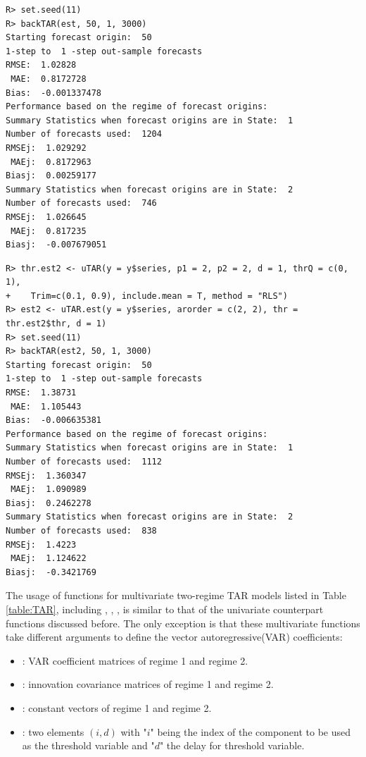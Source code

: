 \begin{verbatim}
R> set.seed(11)
R> backTAR(est, 50, 1, 3000)
Starting forecast origin:  50 
1-step to  1 -step out-sample forecasts 
RMSE:  1.02828 
 MAE:  0.8172728 
Bias:  -0.001337478 
Performance based on the regime of forecast origins:  
Summary Statistics when forecast origins are in State:  1 
Number of forecasts used:  1204 
RMSEj:  1.029292 
 MAEj:  0.8172963 
Biasj:  0.00259177 
Summary Statistics when forecast origins are in State:  2 
Number of forecasts used:  746 
RMSEj:  1.026645 
 MAEj:  0.817235 
Biasj:  -0.007679051 
\end{verbatim}
\begin{verbatim}
R> thr.est2 <- uTAR(y = y$series, p1 = 2, p2 = 2, d = 1, thrQ = c(0, 1),
+    Trim=c(0.1, 0.9), include.mean = T, method = "RLS")
R> est2 <- uTAR.est(y = y$series, arorder = c(2, 2), thr = thr.est2$thr, d = 1)
R> set.seed(11)
R> backTAR(est2, 50, 1, 3000)
Starting forecast origin:  50 
1-step to  1 -step out-sample forecasts 
RMSE:  1.38731 
 MAE:  1.105443 
Bias:  -0.006635381 
Performance based on the regime of forecast origins:  
Summary Statistics when forecast origins are in State:  1 
Number of forecasts used:  1112 
RMSEj:  1.360347 
 MAEj:  1.090989 
Biasj:  0.2462278 
Summary Statistics when forecast origins are in State:  2 
Number of forecasts used:  838 
RMSEj:  1.4223 
 MAEj:  1.124622 
Biasj:  -0.3421769 
\end{verbatim}

The usage of functions for multivariate two-regime TAR models listed in Table \ref{table:TAR}, including , , ,  is similar to that of the univariate
counterpart functions discussed before. The only exception is that these multivariate functions
take different arguments to define the vector autoregressive(VAR) coefficients:
\begin{itemize}\setlength\itemsep{-0.3em}
\item {}: VAR coefficient matrices of regime 1 and regime 2.
\item {}: innovation covariance matrices of regime 1 and regime 2.
\item {}: constant vectors of regime 1 and regime 2.
\item {}: two elements $(i,d)$ with "$i$" being the index of the component to be used as the threshold variable and "$d$" the delay for threshold variable. %
\end{itemize}


